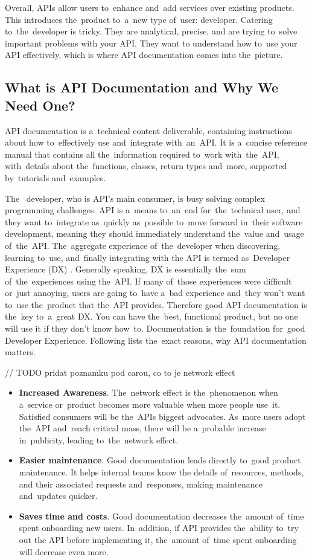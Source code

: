 Overall, APIs allow users to~enhance and~add services over existing products.
This introduces the~product to~a~new type of~user: 
developer. Catering to~the~developer is tricky. They are analytical, precise,
and are trying to~solve important problems with your API. They want to
understand how to~use your API effectively, which is where API documentation
comes into the~picture.

\subsection{What is API Documentation and Why We Need One?}
API documentation is a~technical content deliverable, containing instructions
about how to~effectively use and~integrate with~an~API. It is a~concise
reference manual that contains all the~information required to~work
with~the~API, with~details about the~functions, classes, return types and~more,
supported by~tutorials and~examples. 

The~ developer, who is API's main consumer, is busy solving
complex programming challenges. API is a~means to~an~end for~the~technical user,
and they want to~integrate as~quickly as~possible to~move forward in~their
software development, meaning they should immediately understand the~value
and~usage of~the~API. The~aggregate experience of~the~developer when
discovering, learning to~use, and~finally integrating with the API is termed
as~Developer Experience (DX) \cite{practical-api}.  Generally speaking, DX is
essentially the~sum of~the~experiences using the~API. If many of~those experiences were difficult
or~just annoying, users are going to~have a~bad experience and~they won't want
to~use the~product that the~API provides. Therefore good API documentation is
the~key to~a~great DX. You can have the~best, functional product, but no one
will use it if they don't know how~to. Documentation is the~foundation for~good
Developer Experience. Following lists the~exact reasons, why API documentation
matters.

// TODO pridat poznamku pod carou, co to je network effect
\begin{itemize}
  \item \textbf{Increased Awareness}. The~network effect is the~phenomenon when
  a~service or~product becomes more valuable when more people use~it. Satisfied
  consumers will be the~APIs biggest advocates. As~more users adopt the~API
  and~reach critical mass, there will be a~probable increase in~publicity,
  leading to~the~network effect. 
  \item \textbf{Easier maintenance}. Good documentation leads directly to~good
  product maintenance. It helps internal teams know the details of~resources,
  methods, and their associated requests and~responses, making maintenance
  and~updates quicker.
  \item \textbf{Saves time and costs}. Good documentation decreases
  the~amount of~time spent onboarding new users. In~addition, if API provides
  the~ability to~try out the API before implementing it, the~amount of~time
  spent onboarding will decrease even more.
\end{itemize}

